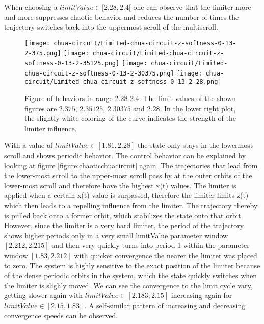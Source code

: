 \documentclass[main]{subfiles}
\begin{document}
When choosing a \(limitValue \in [2.28,2.4[\) one can observe that the limiter more and more suppresses chaotic behavior and reduces the number of times the trajectory switches back into the uppermost scroll of the multiscroll.

\begin{figure}[H]
\centering
\texttt{[image: chua-circuit/Limited-chua-circuit-z-softness-0-13-2-375.png]}
\texttt{[image: chua-circuit/Limited-chua-circuit-z-softness-0-13-2-35125.png]}
\texttt{[image: chua-circuit/Limited-chua-circuit-z-softness-0-13-2-30375.png]}
\texttt{[image: chua-circuit/Limited-chua-circuit-z-softness-0-13-2-28.png]}
\caption[Figure of behaviors in range 2.28-2.4]{Figure of behaviors in range 2.28-2.4. The limit values of the shown figures are \(2.375\), \(2.35125\), \(2.30375\) and \(2.28\). In the lower right plot, the slightly white coloring of the curve indicates the strength of the limiter influence.}
\label{figure:z-2.28-2.4-chaotictrajectories}
\end{figure}

With a value of \(limitValue \in [1.81, 2.28]\) the state only stays in the lowermost scroll and shows periodic behavior. The control behavior can be explained by looking at figure \ref{figure:chaoticchuacircuit} again. The trajectories that lead from the lower-most scroll to the upper-most scroll pass by at the outer orbits of the lower-most scroll and therefore have the highest x(t) values. The limiter is applied when a certain x(t) value is surpassed, therefore the limiter limits z(t) which then leads to a repelling influence from the limiter. The trajectory thereby is pulled back onto a former orbit, which stabilizes the state onto that orbit. However, since the limiter is a very hard limiter, the period of the trajectory shows higher periods only in a very small limitValue parameter window \([2.212,2.215]\) and then very quickly turns into period 1 within the parameter window \([1.83,2.212]\) with quicker convergence the nearer the limiter was placed to zero. The system is highly sensitive to the exact position of the limiter because of the dense periodic orbits in the system, which the state quickly switches when the limiter is slighly moved. We can see the convergence to the limit cycle vary, getting slower again with \(limitValue \in [2.183,2.15]\) increasing again for \(limitValue \in [2.15,1.83]\). A self-similar pattern of increasing and decreasing convergence speeds can be observed.
\end{document}
